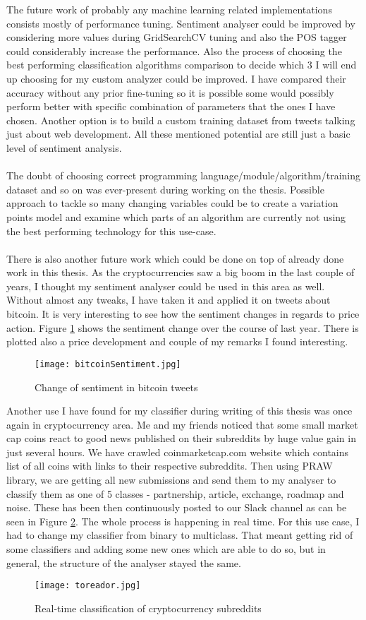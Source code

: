 The future work of probably any machine learning related implementations consists mostly of performance tuning. Sentiment analyser could be improved by considering more values during GridSearchCV tuning and also the POS tagger could considerably increase the performance. Also the process of choosing the best performing classification algorithms comparison to decide which 3 I will end up choosing for my custom analyzer could be improved. I have compared their accuracy without any prior fine-tuning so it is possible some would possibly perform better with specific combination of parameters that the ones I have chosen. Another option is to build a custom training dataset from tweets talking just about web development. All these mentioned potential are still just a basic level of sentiment analysis.\\
\\
The doubt of choosing correct programming language/module/algorithm/training dataset and so on was ever-present during working on the thesis. Possible approach to tackle so many changing variables could be to create a variation points model and examine which parts of an algorithm are currently not using the best performing technology for this use-case.\\
\\
There is also another future work which could be done on top of already done work in this thesis. As the cryptocurrencies saw a big boom in the last couple of years, I thought my sentiment analyser could be used in this area as well. Without almost any tweaks, I have taken it and applied it on tweets about bitcoin. It is very interesting to see how the sentiment changes in regards to price action. Figure \ref{fig:bitcoinSentiment} shows the sentiment change over the course of last year. There is plotted also a price development and couple of my remarks I found interesting.

\begin{figure}[H]%
    \centering
	\texttt{[image: bitcoinSentiment.jpg]}
    \caption{Change of sentiment in bitcoin tweets}%
    \label{fig:bitcoinSentiment}%
\end{figure} 

Another use I have found for my classifier during writing of this thesis was once again in cryptocurrency area. Me and my friends noticed that some small market cap coins react to good news published on their subreddits by huge value gain in just several hours. We have crawled coinmarketcap.com website which contains list of all coins with links to their respective subreddits. Then using PRAW library, we are getting all new submissions and send them to my analyser to classify them as one of 5 classes - partnership, article, exchange, roadmap and noise. These has been then continuously posted to our Slack channel as can be seen in Figure \ref{fig:toreador}. The whole process is happening in real time. For this use case, I had to change my classifier from binary to multiclass. That meant getting rid of some classifiers and adding some new ones which are able to do so, but in general, the structure of the analyser stayed the same.

\begin{figure}[H]%
    \centering
	\texttt{[image: toreador.jpg]}
    \caption{Real-time classification of cryptocurrency subreddits}%
    \label{fig:toreador}%
\end{figure} 
